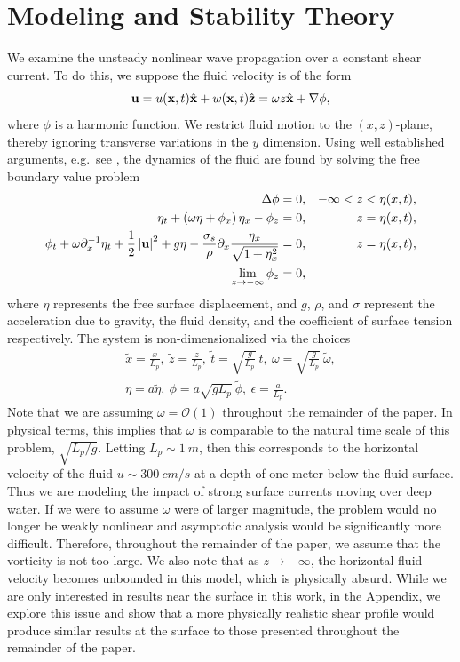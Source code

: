 \documentclass[a4paper,11pt]{article}
\newcommand{\pd}{\partial}
\begin{document}
\section{Modeling and Stability Theory}
We examine the unsteady nonlinear wave propagation over a constant shear current.  To do this, we suppose the fluid velocity is of the form
\[
{\bf u} = u({\bf x},t)\hat{{\bf x}} + w({\bf x},t)\hat{{\bf z}} = \omega z\hat{{\bf x}} + \nabla \phi,
\]
where $\phi$ is a harmonic function.  We restrict fluid motion to the $(x,z)$-plane, thereby ignoring transverse variations in the $y$ dimension.   Using well established arguments, e.g.~see \cite{ashton}, the dynamics of the fluid are found by solving the free boundary value problem
\begin{align}
\Delta \phi = 0, & & -\infty< z < \eta(x,t), \nonumber \\
\eta_{t} +\left(\omega\eta+\phi_{x}\right)\eta_{x} - \phi_{z} = 0, & & z=\eta(x,t), \label{kine}\\
\phi_{t} + \omega\pd_{x}^{-1}\eta_{t} + \frac{1}{2} \left|{\bf
    u}\right|^{2} + g\eta -
\frac{\sigma_{s}}{\rho}\pd_{x}\frac{\eta_{x}}{\sqrt{1+\eta_{x}^{2}}}= 0, &
& z=\eta(x,t), \label{bernou}\\
\lim_{z\rightarrow -\infty} \phi_{z} = 0, \nonumber
\end{align}
where $\eta$ represents the free surface displacement, and $g$, $\rho$, and $\sigma$ represent the acceleration due to gravity, the fluid density, and the coefficient of surface tension respectively.  The system is non-dimensionalized via the choices 
\begin{align*}
\tilde{x} = \frac{x}{L_{p}}, ~\tilde{z} = \frac{z}{L_{p}}, ~ \tilde{t} = \sqrt{\frac{g}{L_{p}}}~t, ~\omega = \sqrt{\frac{g}{L_{p}}}~\tilde{\omega}, \\
\eta = a \tilde{\eta}, ~ \phi  = a\sqrt{gL_{p}}~\tilde{\phi} , ~ \epsilon = \frac{a}{L_{p}}.
\end{align*}
Note that we are assuming $\omega = \mathcal{O}(1)$ throughout the remainder of the paper.  In physical terms, this implies that $\omega$ is comparable to the natural time scale of this problem, $\sqrt{L_{p}/g}$.  Letting $L_{p}\sim 1~m$, then this corresponds to the horizontal velocity of the fluid $u \sim 300 ~cm/s$ at a depth of one meter below the fluid surface.  Thus we are modeling the impact of strong surface currents moving over deep water.  If we were to assume $\omega$ were of larger magnitude, the problem would no longer be weakly nonlinear and asymptotic analysis would be significantly more difficult.  Therefore, throughout the remainder of the paper, we assume that the vorticity is not too large.  We also note that as $z\rightarrow -\infty$, the horizontal fluid velocity becomes unbounded in this model, which is physically absurd.  While we are only interested in results near the surface in this work, in the Appendix, we explore this issue and show that a more physically realistic shear profile would produce similar results at the surface to those presented throughout the remainder of the paper.  
\end{document}
